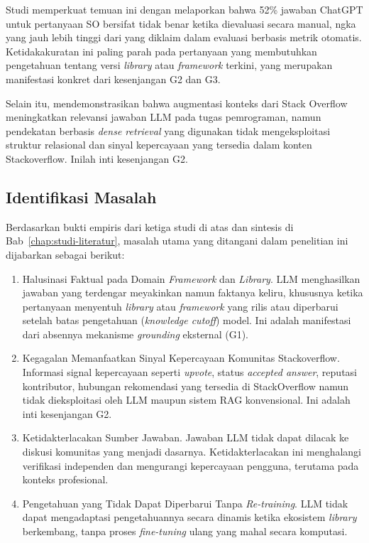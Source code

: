 

Studi \textcite{Kabir2024} memperkuat temuan ini dengan melaporkan bahwa 52\% jawaban ChatGPT untuk pertanyaan SO bersifat tidak benar ketika dievaluasi secara manual, ngka yang jauh lebih tinggi dari yang diklaim dalam evaluasi berbasis metrik otomatis. Ketidakakuratan ini paling parah pada pertanyaan yang membutuhkan pengetahuan tentang versi \emph{library} atau \emph{framework}
terkini, yang merupakan manifestasi konkret dari kesenjangan G2 dan G3.

Selain itu, \textcite{Nashid2023} mendemonstrasikan bahwa augmentasi konteks dari Stack Overflow meningkatkan relevansi jawaban LLM pada tugas pemrograman, namun pendekatan berbasis \emph{dense retrieval} yang digunakan tidak mengeksploitasi struktur relasional dan sinyal kepercayaan yang tersedia dalam konten Stackoverflow. Inilah inti kesenjangan G2.

\subsection{Identifikasi Masalah}
\label{subsec:identifikasi-masalah-kondisi}

Berdasarkan bukti empiris dari ketiga studi di atas dan sintesis di Bab~\ref{chap:studi-literatur}, masalah utama yang ditangani dalam penelitian ini dijabarkan sebagai berikut:

\begin{enumerate}
    \item Halusinasi Faktual pada Domain \emph{Framework} dan \emph{Library}.
    LLM menghasilkan jawaban yang terdengar meyakinkan namun faktanya keliru, khususnya ketika pertanyaan menyentuh
    \emph{library} atau \emph{framework} yang rilis atau diperbarui setelah batas pengetahuan (\emph{knowledge cutoff}) model. Ini adalah manifestasi dari absennya mekanisme \emph{grounding} eksternal (G1).

    \item Kegagalan Memanfaatkan Sinyal Kepercayaan Komunitas Stackoverflow.
    Informasi signal kepercayaan seperti \emph{upvote}, status \emph{accepted answer}, reputasi kontributor, hubungan rekomendasi yang tersedia di StackOverflow namun tidak dieksploitasi oleh LLM maupun sistem RAG konvensional. Ini adalah inti kesenjangan G2.

    \item Ketidakterlacakan Sumber Jawaban.
    Jawaban LLM tidak dapat dilacak ke diskusi komunitas yang menjadi dasarnya. Ketidakterlacakan ini menghalangi verifikasi independen dan mengurangi kepercayaan pengguna, terutama pada konteks profesional.

    \item Pengetahuan yang Tidak Dapat Diperbarui Tanpa \emph{Re-training}. 
    LLM tidak dapat mengadaptasi pengetahuannya secara dinamis ketika ekosistem \emph{library} berkembang, tanpa proses
    \emph{fine-tuning} ulang yang mahal secara komputasi.
\end{enumerate}



